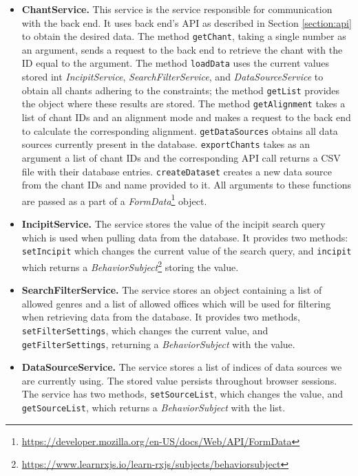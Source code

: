 \begin{itemize}

\item\textbf{ChantService.} This service is the service responsible for communication with the back end. It uses back end's API as described in Section \ref{section:api} to
obtain the desired data. The method \verb|getChant|, taking a single number as an argument, sends a request to the back end to retrieve the chant with 
the ID equal to the argument. The method \verb|loadData| uses the current values stored int \emph{IncipitService}, \emph{SearchFilterService}, and
\emph{DataSourceService} to obtain all chants adhering to the constraints; the method \verb|getList| provides the object where these results are stored.
The method \verb|getAlignment| takes a list of chant IDs and an alignment mode and makes a request to the back end to calculate the corresponding alignment.
\verb|getDataSources| obtains all data sources currently present in the database. \verb|exportChants| takes as an argument a list of chant IDs and the 
corresponding API call returns a CSV file with their database entries. \verb|createDataset| creates a new data source from the chant IDs and name provided
to it. All arguments to these functions are passed as a part of a \emph{FormData}\footnote{\url{https://developer.mozilla.org/en-US/docs/Web/API/FormData}}
object.

\item\textbf{IncipitService.} The service stores the value of the incipit search query which is used when pulling data from the database. It provides two methods:
\verb|setIncipit| which changes the current value of the search query, and \verb|incipit| which returns a \emph{BehaviorSubject}\footnote{\url{https://www.learnrxjs.io/learn-rxjs/subjects/behaviorsubject}}
storing the value.

\item\textbf{SearchFilterService.} The service stores an object containing a list of allowed genres and a list of allowed offices which will be used for filtering
when retrieving data from the database. It provides two methods, \verb|setFilterSettings|, which changes the current value, and \verb|getFilterSettings|, returning
a \emph{BehaviorSubject} with the value.

\item\textbf{DataSourceService.} The service stores a list of indices of data sources we are currently using. The stored value persists throughout browser sessions.
The service has two methods, \verb|setSourceList|, which changes the value, and \verb|getSourceList|, which returns a \emph{BehaviorSubject} with the list.


\end{itemize}
